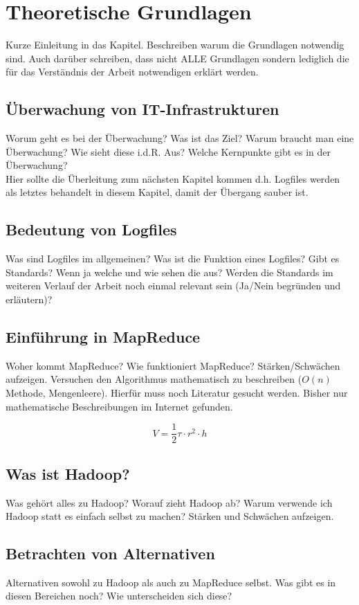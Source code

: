 
\chapter{Theoretische Grundlagen}\label{cha:Grundlagen}
Kurze Einleitung in das Kapitel. Beschreiben warum die Grundlagen notwendig sind. Auch darüber schreiben, dass nicht ALLE Grundlagen sondern lediglich die für das Verständnis der Arbeit notwendigen erklärt werden.

\section{Überwachung von IT-Infrastrukturen}\label{sec:UeberwachungIT}
Worum geht es bei der Überwachung? Was ist das Ziel? Warum braucht man eine Überwachung? Wie sieht diese i.d.R. Aus? Welche Kernpunkte gibt es in der Überwachung? \\
Hier sollte die Überleitung zum nächsten Kapitel kommen d.h. Logfiles werden als letztes behandelt in diesem Kapitel, damit der Übergang sauber ist.

\section{Bedeutung von Logfiles}\label{sec:BedeutungVonLogfiles}
Was sind Logfiles im allgemeinen? Was ist die Funktion eines Logfiles? Gibt es Standards? Wenn ja welche und wie sehen die aus? Werden die Standards im weiteren Verlauf der Arbeit noch einmal relevant sein (Ja/Nein begründen und erläutern)?

\section{Einführung in MapReduce}\label{sec:EinführungInMapReduce}
Woher kommt MapReduce? Wie funktioniert MapReduce? Stärken/Schwächen aufzeigen. Versuchen den Algorithmus mathematisch zu beschreiben ($O(n)$ Methode, Mengenleere). Hierfür muss noch Literatur gesucht werden. Bisher nur mathematische Beschreibungen im Internet gefunden.

\begin{equation}
	V = \frac{1}{2} \tau \cdot r^{2} \cdot h
\end{equation}

\section{Was ist Hadoop?}\label{sec:WasIstHadoop}
Was gehört alles zu Hadoop? Worauf zieht Hadoop ab? Warum verwende ich Hadoop statt es einfach selbst zu machen? Stärken und Schwächen aufzeigen.

\section{Betrachten von Alternativen}
Alternativen sowohl zu Hadoop als auch zu MapReduce selbst. Was gibt es in diesen Bereichen noch? Wie unterscheiden sich diese?